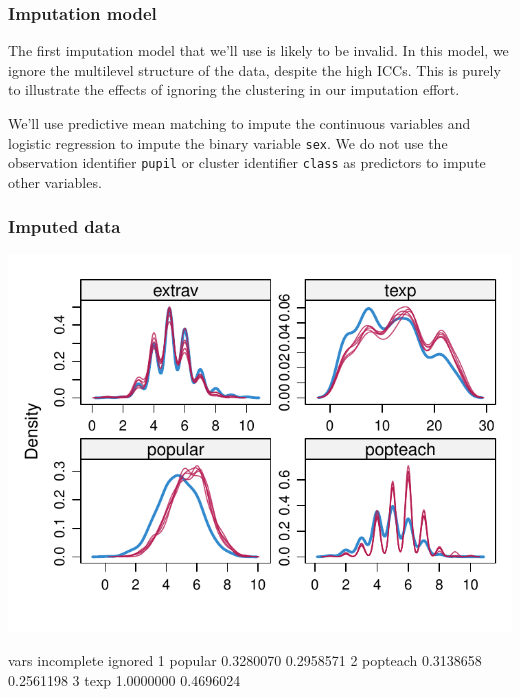 \documentclass[
]{jss}
\begin{document}
\hypertarget{imputation-model}{%
\subsubsection{Imputation model}\label{imputation-model}}

The first imputation model that we'll use is likely to be invalid. In
this model, we ignore the multilevel structure of the data, despite the
high ICCs. This is purely to illustrate the effects of ignoring the
clustering in our imputation effort.

We'll use predictive mean matching to impute the continuous variables
and logistic regression to impute the binary variable \texttt{sex}. We
do not use the observation identifier \texttt{pupil} or cluster
identifier \texttt{class} as predictors to impute other variables.

\begin{CodeChunk}
\end{CodeChunk}

\hypertarget{imputed-data}{%
\subsubsection{Imputed data}\label{imputed-data}}

\begin{CodeChunk}


\begin{center}\includegraphics{Manuscript_files/figure-latex/pop_ignored_eval-1} \end{center}

\begin{CodeOutput}
      vars incomplete   ignored
1  popular  0.3280070 0.2958571
2 popteach  0.3138658 0.2561198
3     texp  1.0000000 0.4696024
\end{CodeOutput}
\end{CodeChunk}
\end{document}
